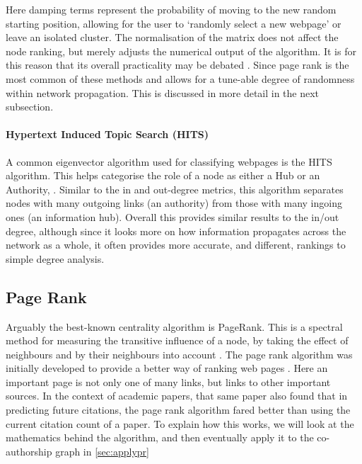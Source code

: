 Here damping terms represent the probability of moving to the new random starting position, allowing for the user to `randomly select a new webpage' or leave an isolated cluster. The normalisation of the matrix does not affect the node ranking, but merely adjusts the numerical output of the algorithm. It is for this reason that its overall practicality may be debated \citep{spectral}. Since page rank is the most common of these methods and allows for a tune-able degree of randomness within network propagation. This is discussed in more detail in the next subsection.


    
    \paragraph*{Hypertext Induced Topic Search (HITS)}\label{hits}
    A common eigenvector algorithm used for classifying webpages is the 
    HITS algorithm. This helps categorise the role of a node as either a Hub or an Authority,
     \citep{hits,hitsvspagerank,hitsweb}. Similar to the in and out-degree metrics, this algorithm separates nodes with many outgoing links (an authority) from those with many ingoing ones (an information hub). Overall this provides similar results to the in/out degree, although since it looks more on how information propagates across the network as a whole, it often provides more accurate, and different, rankings to simple degree analysis.  
     
     
% 
% 






\subsection{Page Rank}\label{sec:pagerank}
Arguably the best-known centrality algorithm is PageRank. This is a spectral method for measuring the transitive influence of a node, by taking the effect of neighbours and by their neighbours into account \citep{neoj4}. The page rank algorithm was initially developed to provide a better way of ranking web pages \citep{google}. Here an important page is not only one of many links, but links to other important sources. In the context of academic papers, that same paper also found that in predicting future citations, the page rank algorithm fared better than using the current citation count of a paper. 
To explain how this works, we will look at the mathematics behind the algorithm, and then eventually apply it to the co-authorship graph in \autoref{sec:applypr}


